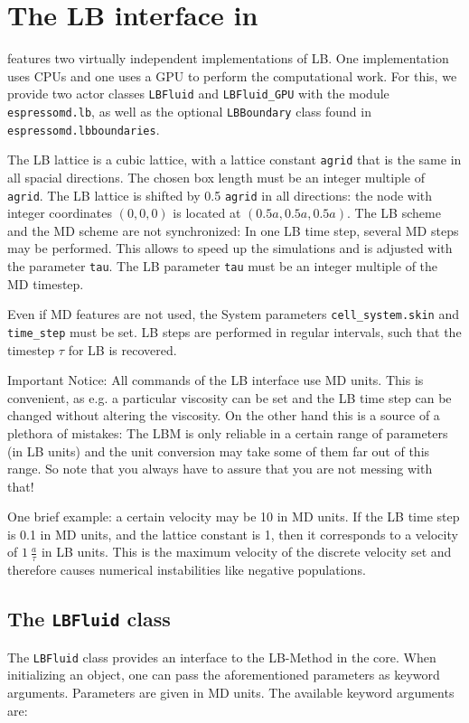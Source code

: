 

\section{The LB interface in \ES{}}
\ES{} features two virtually independent implementations of LB. One implementation
uses CPUs and one uses a GPU to perform the computational work. For this, we
provide two actor classes \texttt{LBFluid} and \texttt{LBFluid\_GPU} with the
module \texttt{espressomd.lb}, as well as the optional \texttt{LBBoundary} class
found in \texttt{espressomd.lbboundaries}.

The LB lattice is a cubic lattice, with a lattice constant \texttt{agrid} that
is the same in all spacial directions. The chosen box length must be an integer multiple
of \texttt{agrid}. The LB lattice is shifted by 0.5 \texttt{agrid} in all directions: the node
with integer coordinates $\left(0,0,0\right)$ is located at
$\left(0.5a,0.5a,0.5a\right)$.
The LB scheme and the MD scheme are not synchronized: In one
LB time step, several MD steps may be performed. This allows to speed
up the simulations and is adjusted with the parameter \texttt{tau}.
The LB parameter \texttt{tau} must be an integer multiple of the MD timestep.

Even if MD features are not used, the System parameters \texttt{cell\_system.skin} and
\texttt{time\_step} must be set. LB steps are performed 
in regular intervals, such that the timestep $\tau$ for LB is recovered. 

Important Notice: All commands of the LB interface use
MD units. This is convenient, as e.g. a particular 
viscosity can be set and the LB time step can be changed without
altering the viscosity. On the other hand this is a source
of a plethora of mistakes: The LBM is only reliable in a certain 
range of parameters (in LB units) and the unit conversion
may take some of them far out of this range. So note that you always
have to assure that you are not messing with that!

One brief example: a certain velocity may be 10 in MD units.
If the LB time step is 0.1 in MD units, and the lattice constant
is 1, then it corresponds to a velocity of $1\ \frac{a}{\tau}$ in LB units.
This is the maximum velocity of the discrete velocity set and therefore
causes numerical instabilities like negative populations.

\subsection*{The \texttt{LBFluid} class}
The \texttt{LBFluid} class provides an interface to the LB-Method in the \ES{}
core. When initializing an object, one can pass the aforementioned parameters
as keyword arguments. Parameters are given in MD units. The available keyword
arguments are:



